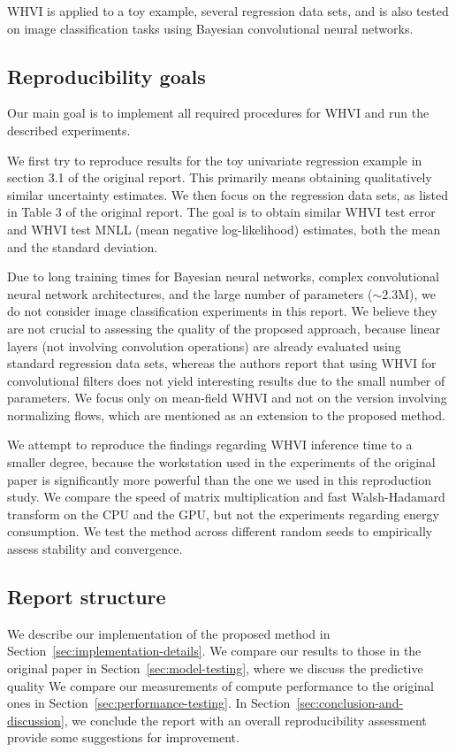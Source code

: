 WHVI is applied to a toy example, several regression data sets, and is also tested on image classification tasks using Bayesian convolutional neural networks.

\subsection{Reproducibility goals}\label{subsec:reproducibility-goals}
Our main goal is to implement all required procedures for WHVI and run the described experiments.

We first try to reproduce results for the toy univariate regression example in section 3.1 of the original report.
This primarily means obtaining qualitatively similar uncertainty estimates.
We then focus on the regression data sets, as listed in Table 3 of the original report.
The goal is to obtain similar WHVI test error and WHVI test MNLL (mean negative log-likelihood) estimates, both the mean and the standard deviation.

Due to long training times for Bayesian neural networks, complex convolutional neural network architectures, and the large number of parameters ($\sim 2.3$M), we do not consider image classification experiments in this report.
We believe they are not crucial to assessing the quality of the proposed approach, because linear layers (not involving convolution operations) are already evaluated using standard regression data sets, whereas the authors report that using WHVI for convolutional filters does not yield interesting results due to the small number of parameters.
We focus only on mean-field WHVI and not on the version involving normalizing flows, which are mentioned as an extension to the proposed method.

We attempt to reproduce the findings regarding WHVI inference time to a smaller degree, because the workstation used in the experiments of the original paper is significantly more powerful than the one we used in this reproduction study.
We compare the speed of matrix multiplication and fast Walsh-Hadamard transform on the CPU and the GPU, but not the experiments regarding energy consumption.
We test the method across different random seeds to empirically assess stability and convergence.

\subsection{Report structure}\label{subsec:report-structure}
We describe our implementation of the proposed method in Section~\ref{sec:implementation-details}.
We compare our results to those in the original paper in Section~\ref{sec:model-testing}, where we discuss the predictive quality
We compare our measurements of compute performance to the original ones in Section~\ref{sec:performance-testing}.
In Section~\ref{sec:conclusion-and-discussion}, we conclude the report with an overall reproducibility assessment provide some suggestions for improvement.
